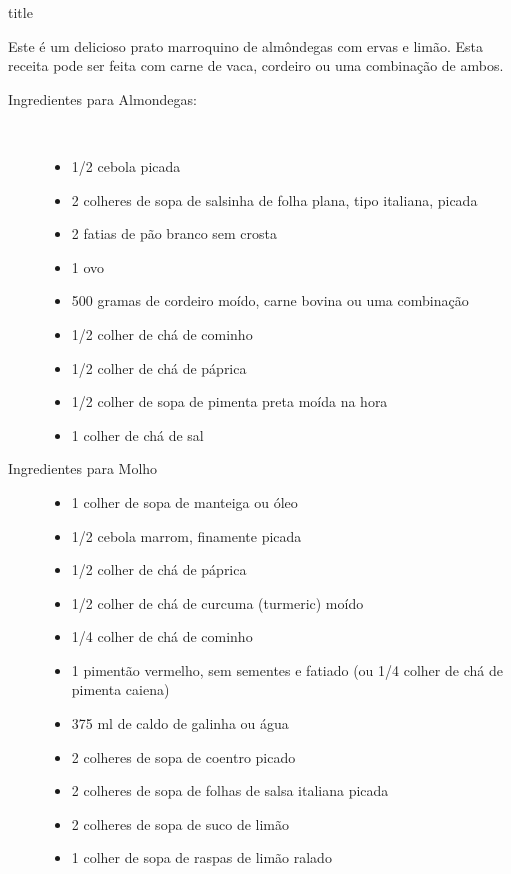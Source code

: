 \documentclass [11pt, papel de carta] {article}
\begin{document}
 {title}

Este é um delicioso prato marroquino de almôndegas com ervas e limão. Esta receita pode ser feita com carne de vaca, cordeiro ou uma combinação de ambos.

\begin {description}

\item [Ingredientes para Almondegas:] \ \\
\begin {itemize}
\item 1/2 cebola picada
\item 2 colheres de sopa de salsinha de folha plana, tipo italiana, picada
\item 2 fatias de pão branco sem crosta
\item 1 ovo
\item 500 gramas de cordeiro moído, carne bovina ou uma combinação
\item 1/2 colher de chá de cominho
\item 1/2 colher de chá de páprica
\item 1/2 colher de sopa de pimenta preta moída na hora
\item 1 colher de chá de sal
\end {itemize}

\item [Ingredientes para Molho]
\begin {itemize}
\item 1 colher de sopa de manteiga ou óleo
\item 1/2 cebola marrom, finamente picada
\item 1/2 colher de chá de páprica
\item 1/2 colher de chá de curcuma (turmeric) moído
\item 1/4 colher de chá de cominho
\item 1 pimentão vermelho, sem sementes e fatiado (ou 1/4 colher de chá de pimenta caiena)
\item 375 ml de caldo de galinha ou água
\item 2 colheres de sopa de coentro picado
\item 2 colheres de sopa de folhas de salsa italiana picada
\item 2 colheres de sopa de suco de limão
\item 1 colher de sopa de raspas de limão ralado
\end {itemize}


\end{description}
\end{document}
